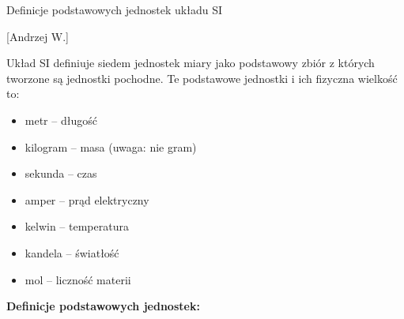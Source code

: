 \documentclass{article}
\begin{document}
\begin{enumerate}
\begin{itemize}
\end{itemize}















\newpage



{\Large \bf  \item Definicje podstawowych jednostek układu SI} [Andrzej W.]

Układ SI definiuje siedem jednostek miary jako podstawowy zbiór z których tworzone są jednostki pochodne. Te podstawowe jednostki i ich fizyczna wielkość to:
\begin{itemize}
\item    metr – długość
\item     kilogram – masa (uwaga: nie gram)
\item     sekunda – czas
\item     amper – prąd elektryczny
\item     kelwin – temperatura
\item     kandela – światłość
\item     mol – liczność materii
\end{itemize}

{\bf Definicje podstawowych jednostek:}


\end{enumerate}
\end{document}
